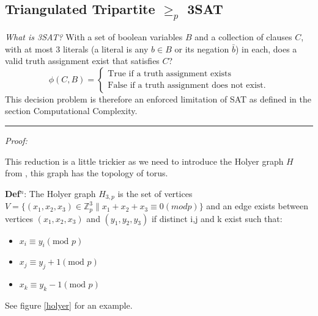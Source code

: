 \documentclass[a4paper,11pt]{report}
\newcounter{col}
\begin{document}


\subsection{Triangulated Tripartite $\geq_p$ 3SAT}

\textit{What is 3SAT?} With a set of boolean variables $B$ and a collection of clauses $C$, with at most 3 literals (a literal is any $b \in B$ or its negation $\bar{b}$) in each, does a valid truth assignment exist that satisfies $C$?
		\begin{equation}
		        \phi (C,B) = \begin{cases}
		            \text{True if a truth assignment exists} \\
		            \text{False if a truth assignment does not exist}.
				\end{cases}
		\end{equation}
This decision problem is therefore an enforced limitation of SAT as defined in the section Computational Complexity.

\noindent\rule{4cm}{0.4pt}

\textit{Proof:}

This reduction is a little trickier as we need to introduce the Holyer graph $H$ from \cite{holyer}, this graph has the topology of torus.

\textbf{Def$^n$}: The Holyer graph $H_{3,p}$ is the set of vertices $V=\{(x_1,x_2,x_3)\in \mathbb{Z}_p^3 \| x_1+x_2+x_3 \equiv 0 (mod p)\}$ and an edge exists between vertices $(x_1,x_2,x_3)$ and $(y_1,y_2,y_3)$ if distinct i,j and k exist such that:
\begin{itemize}
\item $x_i\equiv y_i (\text{mod }p)$
\item $x_j\equiv y_j+1 (\text{mod }p)$
\item $x_k\equiv y_k-1 (\text{mod }p)$
\end{itemize}
See figure \ref{holyer} for an example.
\end{document}
